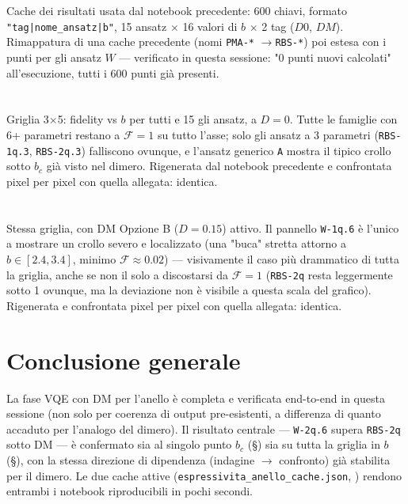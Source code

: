 \documentclass[11pt,a4paper]{article}
\begin{document}
\section*{\texttt{}}

Cache dei risultati usata dal notebook precedente: 600 chiavi, formato
\texttt{"tag|nome\_ansatz|b"}, 15 ansatz $\times$ 16 valori di $b$ $\times$ 2 tag
($D0$, $DM$). Rimappatura di una cache precedente (nomi \texttt{PMA-*}
$\to$\texttt{RBS-*}) poi estesa con i punti per gli ansatz $W$ — verificato in
questa sessione: "0 punti nuovi calcolati" all'esecuzione, tutti i 600 punti già
presenti.

\section*{\texttt{}}

Griglia 3$\times$5: fidelity vs $b$ per tutti e 15 gli ansatz, a $D=0$. Tutte le
famiglie con 6+ parametri restano a $\mathcal F=1$ su tutto l'asse; solo gli ansatz
a 3 parametri (\texttt{RBS-1q.3}, \texttt{RBS-2q.3}) falliscono ovunque, e l'ansatz
generico \texttt{A} mostra il tipico crollo sotto $b_c$ già visto nel dimero.
Rigenerata dal notebook precedente e confrontata pixel per pixel con quella
allegata: identica.

\section*{\texttt{}}

Stessa griglia, con DM Opzione B ($D=0.15$) attivo. Il pannello \texttt{W-1q.6} è
l'unico a mostrare un crollo severo e localizzato (una "buca" stretta attorno a
$b\in[2.4,3.4]$, minimo $\mathcal F\approx0.02$) — visivamente il caso più
drammatico di tutta la griglia, anche se non il solo a discostarsi da $\mathcal
F=1$ (\texttt{RBS-2q} resta leggermente sotto 1 ovunque, ma la deviazione non è
visibile a questa scala del grafico). Rigenerata e confrontata pixel per pixel con
quella allegata: identica.

\section*{Conclusione generale}

La fase VQE con DM per l'anello è completa e verificata end-to-end in questa
sessione (non solo per coerenza di output pre-esistenti, a differenza di quanto
accaduto per l'analogo del dimero). Il risultato centrale — \texttt{W-2q.6} supera
\texttt{RBS-2q} sotto DM — è confermato sia al singolo punto $b_c$
(§\texttt{}) sia su tutta la
griglia in $b$ (§\texttt{}),
con la stessa direzione di dipendenza (indagine $\to$ confronto) già stabilita per
il dimero. Le due cache attive (\texttt{espressivita\_anello\_cache.json},
\texttt{}) rendono entrambi i
notebook riproducibili in pochi secondi.
\end{document}
